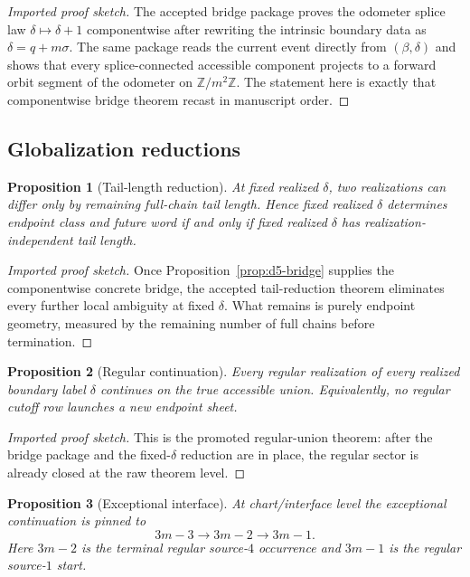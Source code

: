 \documentclass[11pt]{article}
\newtheorem{proposition}{Proposition}
\begin{document}
\begin{proof}[Imported proof sketch]
The accepted bridge package proves the odometer splice law $\delta\mapsto\delta+1$ componentwise after rewriting the intrinsic boundary data as
$\delta=q+m\sigma$.
The same package reads the current event directly from $(\beta,\delta)$ and shows that every splice-connected accessible component projects to a forward orbit segment of the odometer on $\mathbb Z/m^2\mathbb Z$.
The statement here is exactly that componentwise bridge theorem recast in manuscript order.
\end{proof}

\subsection{Globalization reductions}

\begin{proposition}[Tail-length reduction]\label{prop:d5-tail}
At fixed realized $\delta$, two realizations can differ only by remaining full-chain tail length.
Hence fixed realized $\delta$ determines endpoint class and future word if and only if fixed realized $\delta$ has realization-independent tail length.
\end{proposition}

\begin{proof}[Imported proof sketch]
Once Proposition~\ref{prop:d5-bridge} supplies the componentwise concrete bridge, the accepted tail-reduction theorem eliminates every further local ambiguity at fixed $\delta$.
What remains is purely endpoint geometry, measured by the remaining number of full chains before termination.
\end{proof}

\begin{proposition}[Regular continuation]\label{prop:d5-regular}
Every regular realization of every realized boundary label $\delta$ continues on the true accessible union.
Equivalently, no regular cutoff row launches a new endpoint sheet.
\end{proposition}

\begin{proof}[Imported proof sketch]
This is the promoted regular-union theorem: after the bridge package and the fixed-$\delta$ reduction are in place, the regular sector is already closed at the raw theorem level.
\end{proof}

\begin{proposition}[Exceptional interface]\label{prop:d5-interface}
At chart/interface level the exceptional continuation is pinned to
\[
3m-3 \to 3m-2 \to 3m-1.
\]
Here $3m-2$ is the terminal regular source-$4$ occurrence and $3m-1$ is the regular source-$1$ start.
\end{proposition}
\end{document}
